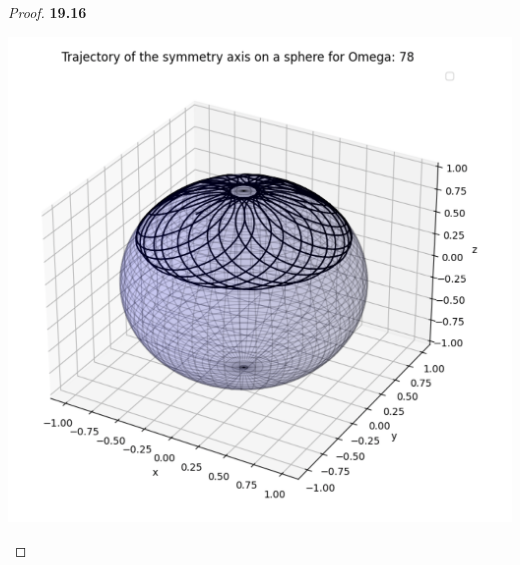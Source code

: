 \documentclass[11pt]{article}
\theoremstyle{definition}
\begin{document}
\begin{proof}{\textbf{19.16}}
\begin{center}
        \includegraphics[scale=0.4]{ch19-16-4.png}
    \end{center}
\end{proof}
\cleardoublepage
\end{document}
